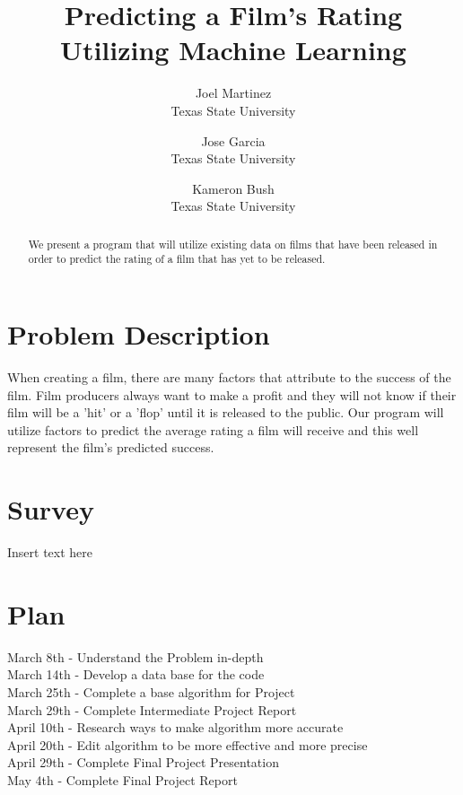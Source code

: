\documentclass[10pt,twocolumn,letterpaper]{article}
\begin{document}
\title{Predicting a Film's Rating Utilizing Machine Learning}

\author{Joel Martinez\\
Texas State University\\
\and
Jose Garcia\\
Texas State University\\
\and
Kameron Bush\\
Texas State University\\
}
\maketitle

\begin{abstract}
   We present a program that will utilize existing data on films that have been released in order to predict the rating of a film that has yet to be released.
\end{abstract}

\section{Problem Description}
	When creating a film, there are many factors that attribute to the success of the film. Film producers always want to make a profit and they will not know if their film will be a 'hit' or a 'flop' until it is released to the public. Our program will utilize factors to predict the average rating a film will receive and this well represent the film's predicted success.

\section{Survey}
	{Insert text here}

\section{Plan}
	March 8th - Understand the Problem in-depth\\
	March 14th - Develop a data base for the code\\
	March 25th - Complete a base algorithm for Project\\
	March 29th - Complete Intermediate Project Report\\
	April 10th - Research ways to make algorithm more accurate\\
	April 20th - Edit algorithm to be more effective and more precise\\ 
	April 29th - Complete Final Project Presentation\\
	May 4th - Complete Final Project Report
\end{document}

